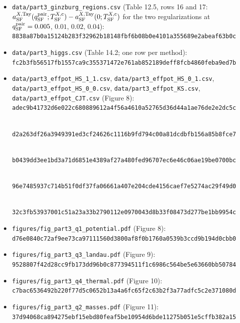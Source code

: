 \documentclass[
  10pt,
]{article}
\begin{document}
\begin{itemize}
  \(q^{\rm pair}_{\rm SF}=0.01\), \(0.02\) of the extrapolation, the
  norms of the other pair channels at \(q^{\rm pair}_{\rm SF}=0\) and
  \(0.01\), \(a^{X,{\rm Tay}}_{\rm SF}(0;T^{X,{\rm c}}_{\rm SF})\),
  \({\rm Gi}^{X}_{\rm SF}\),
  \({\rm Gi}^{X}_{\rm SF}T^{X,{\rm c}}_{\rm SF}\),
  \(\xi^{X,{\rm GL}}_{\rm SF}\), and the field
  \((\alpha^{X,{\rm GL}}_{\rm SF}{\rm Gi}^{X}_{\rm SF}/(2b^{X,{\rm Tay}}_{\rm SF}))^{1/2}\)
  of mean-field theory at
  \(t^{\rm red}_{\rm SF}=-{\rm Gi}^{X}_{\rm SF}\)):\\
  \texttt{792891d8f448384be6b4220806b9db339f60ea76d47db109de0b002f0f93b98c}
\item
  \texttt{data/part3\_ginzburg\_regions.csv} (Table 12.5, rows 16 and
  17:
  \(a^{X,{\rm Tay}}_{\rm SF}(q^{\rm pair}_{\rm SF};T^{X,{\rm c}}_{\rm SF})-a^{X,{\rm Tay}}_{\rm SF}(0;T^{X,{\rm c}}_{\rm SF})\)
  for the two regularizations at \(q^{\rm pair}_{\rm SF}=0.005\),
  \(0.01\), \(0.02\), \(0.04\)):\\
  \texttt{8838a87b0a15124b283f32962b18148fbf6b08b0e4101a355689e2abeaf63b0c}
\item
  \texttt{data/part3\_higgs.csv} (Table 14.2; one row per method):\\
  \texttt{fc2b3fb56517fb1557ca9c355371472e761ab852189deff8fcb4860feba9ed7b}
\item
  \texttt{data/part3\_effpot\_HS\_1\_1.csv},
  \texttt{data/part3\_effpot\_HS\_0\_1.csv},
  \texttt{data/part3\_effpot\_HS\_0\_0.csv},
  \texttt{data/part3\_effpot\_KS.csv},
  \texttt{data/part3\_effpot\_CJT.csv} (Figure 8):\\
  \texttt{adec9b41732d6e022c680889612a4f56a4610a52765d36d44a1ae76de2e2dc5c}\strut \\
  \texttt{d2a263df26a3949391ed3cf24626c1116b9fd794c00a81dcdbfb156a85b8fce7}\strut \\
  \texttt{b0439dd3ee1bd3a71d6851e4389af27a480fed96707ec6e46c06ae19be0700bc}\strut \\
  \texttt{96e7485937c714b51f0df37fa06661a407e204cde4156caef7e5274ac29f49d0}\strut \\
  \texttt{32c3fb53937001c51a23a33b2790112e0970043d8b33f08473d277be1bb9954c}
\item
  \texttt{figures/fig\_part3\_q1\_potential.pdf} (Figure 8):\\
  \texttt{d76e0840c72af9ee73ca97111560d3800af8f0b1760a0539b3ccd9b194d0cbb0}
\item
  \texttt{figures/fig\_part3\_q3\_landau.pdf} (Figure 9):\\
  \texttt{9528807f42d28cc9fb173dd96b0c877394511f1c6986c564be5e63660bb50784}
\item
  \texttt{figures/fig\_part3\_q4\_thermal.pdf} (Figure 10):\\
  \texttt{c7bac6536492b220f77d5c0652b13a4a6fc65f2c63b2f3a77adfc5c2e371080d}
\item
  \texttt{figures/fig\_part3\_q2\_masses.pdf} (Figure 11):\\
  \texttt{37d94068ca894275ebf15ebd80feaf5be10954d6bde11275b051e5cffb382a15}
\end{itemize}
\end{document}

